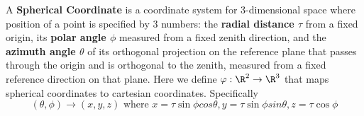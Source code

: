 \documentclass[11pt]{article}
\begin{document}
\begin{defn*}
  A \textbf{Spherical Coordinate} is a coordinate system for 3-dimensional space where position of a point is specified by 3 numbers: the \textbf{radial distance $\tau$} from a fixed origin, its \textbf{polar angle $\phi$} measured from a fixed zenith direction, and the \textbf{azimuth angle $\theta$}  of its orthogonal projection on the reference plane that passes through the origin and is orthogonal to the zenith, measured from a fixed reference direction on that plane. Here we define $\varphi: \R^2 \to \R^3$ that maps spherical coordinates to cartesian coordinates. Specifically
  \[
    (\theta, \phi) \to (x,y,z) \text{ where } x = \tau \sin \phi cos \theta, y = \tau \sin \phi sin \theta, z = \tau \cos \phi
  \]
\end{defn*}
\end{document}
